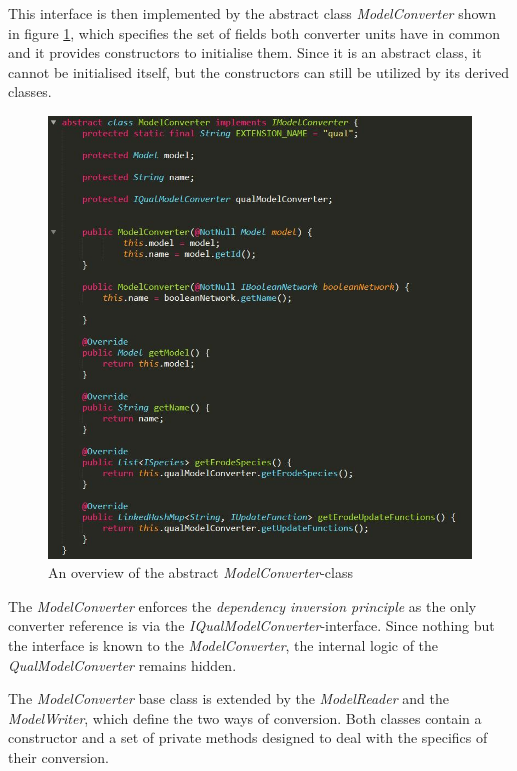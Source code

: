 This interface is then implemented by the abstract class \emph{ModelConverter} shown in figure \ref{fig:abstractModel}, which specifies the set of fields both converter units have in common and it provides constructors to initialise them. Since it is an abstract class, it cannot be initialised itself, but the constructors can still be utilized by its derived classes.
\begin{figure}[H]
    \centering
    \includegraphics[scale=0.8]{Sections/Images/AbstractModel.JPG}
    \caption{An overview of the abstract \emph{ModelConverter}-class}
    \label{fig:abstractModel}
\end{figure}
The \emph{ModelConverter} enforces the \emph{dependency inversion principle} as the only converter reference is via the \emph{IQualModelConverter}-interface. Since nothing but the interface is known to the \emph{ModelConverter}, the internal logic of the \emph{QualModelConverter} remains hidden.

The \emph{ModelConverter} base class is extended by the \emph{ModelReader} and the \emph{ModelWriter}, which define the two ways of conversion. Both classes contain a constructor and a set of private methods designed to deal with the specifics of their conversion.

